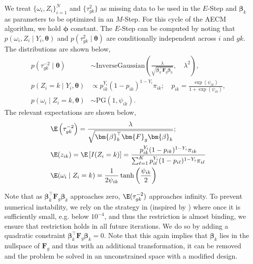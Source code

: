 We treat $\{\omega_i, Z_i\}_{i=1}^N$ and $\{\tau^2_{gk}\}$ as missing
data to be used in the $E$-Step and $\bm{\beta}_k$ as parameters to be
optimized in an $M$-Step. For this cycle of the AECM algorithm, we hold $\bm{\phi}$ constant. The $E$-Step can be computed by noting that $p(\omega_i, Z_i \mid Y_i, \bm{\theta})$ and $p(\tau^2_{gk} \mid \bm{\theta})$ are conditionally independent across $i$ and $gk$. The distributions are shown below,
\begin{subequations}
\begin{align}
p(\tau^{-2}_{gk} \mid \bm{\theta}) &\sim \mathrm{InverseGaussian}\left(\frac{\lambda}{\sqrt{\bm{\beta}_k^\top\bm{F}_g\bm{\beta}_k}}, \quad \lambda^2\right), \\
p(Z_i = k \mid Y_i, \bm{\theta}) &\propto p_{ik}^{Y_i} (1-p_{ik})^{1-Y_i} \pi_{ik}; \quad p_{ik} = \frac{\exp(\psi_{ik})}{1+\exp(\psi_{ik})}, \\
p(\omega_i \mid Z_i = k, \bm{\theta}) &\sim \mathrm{PG}\left(1, \psi_{ik}\right).
\end{align}
\end{subequations}
The relevant expectations are shown below,
\begin{subequations}
\begin{align}
& \E\left(\tau^{-2}_{gk}\right) = \frac{\lambda}{\sqrt{\bm{\beta}_k^\top\bm{F}_g\bm{\beta}_k}}; \\
& \E (z_{ik}) = \E\left[I(Z_i = k)\right] = \frac{p_{ik}^{Y_i} (1-p_{ik})^{1-Y_i} \pi_{ik}}{\sum_{\ell=1}^K p_{i\ell}^{Y_i} (1-p_{i\ell})^{1-Y_i} \pi_{i\ell}} \\
& \E (\omega_{i} \mid Z_i = k) = \frac{1}{2\psi_{ik}} \tanh\left(\frac{\psi_{ik}}{2}\right)
\end{align}
\end{subequations}

Note that as $\bm{\beta}_k^\top \bm{F}_g \bm{\beta}_k$ approaches
zero, $\E(\tau^{-2}_{gk})$ approaches infinity. To prevent numerical
instability, we rely on the strategy in \cite{goplerud2021sparsity}
(inspired by \citealt{polson2011svm}) where once it is sufficiently
small, e.g. below $10^{-4}$, and thus the restriction is almost
binding, we ensure that restriction holds in all future iterations. We
do so by adding a quadratic constraint
$\bm{\beta}_k^\top \bm{F}_g \bm{\beta}_k = 0$. Note that this again
implies that $\bm{\beta}_k$ lies in the nullspace of $\bm{F}_g$ and
thus with an additional transformation, it can be removed and the
problem be solved in an unconstrained space with a modified design.

